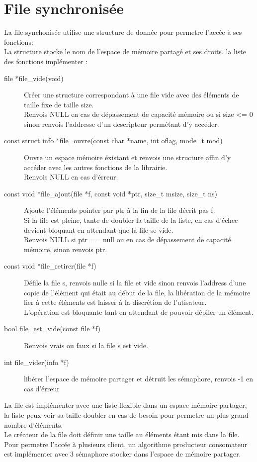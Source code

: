 \documentclass[12pt]{article}
\begin{document}
\section{File synchronisée}
    La file synchonisée utilise une structure de donnée pour permetre l'accée à ses fonctions:\\
    La structure stocke le nom de l'espace de mémoire partagé et ses droits.
    la liste des fonctions implémenter :
    \begin{description}
        \item [file *file\_vide(void)] Créer une structure correspondant à une file vide avec des éléments de taille
        fixe de taille size.\\
        Renvois NULL en cas de dépassement de capacité mémoire ou si size <= 0\\
        sinon renvois l'addresse d'un descripteur permétant d'y accéder.

        \item [const struct info *file\_ouvre(const char *name, int oflag, mode\_t mod)] Ouvre un espace mémoire éxistant et renvois une structure affin d'y accéder avec les autres fonctions de la librairie.\\
        Renvois NULL en cas d'érreur.

        \item [const void *file\_ajout(file *f, const void *ptr, size\_t msize, size\_t ns)]  Ajoute l'éléments pointer par ptr à la fin de la file décrit pas f.\\
        Si la file est pleine, tante de doubler la taille de la liste, en cas d'échec
        devient bloquant en attendant que la file se vide.\\
        Renvois NULL si ptr == null ou en cas de dépassement de capacité mémoire, sinon renvois ptr.

        \item [const void *file\_retirer(file *f)] Défile la file s, renvois nulle si la file et vide sinon renvois l'address d'une copie de l'élément qui était au début de la file, la libération de la mémoire lier à cette éléments est laisser à la discrétion de l'utisateur.\\
        L'opération est bloquante tant en attendant de pouvoir dépiler un élément.

        \item [bool file\_est\_vide(const file *f)] Renvois vrais ou faux si la file s est vide.

        \item [int file\_vider(info *f)] libérer l'espace de mémoire partager et détruit les sémaphore, renvois -1 en cas d'érreur
    \end{description}
    La file est implémenter avec une liste flexible dans un espace mémoire partager, la liste peux voir sa taille doubler en cas de besoin pour permetre un plus grand nombre d'éléments. \\
    Le créateur de la file doit définir une taille au éléments étant mis dans la file.\\
    Pour permetre l'accée à plusieurs client, un algorithme producteur consomateur est implémenter avec 3 sémaphore stocker dans l'espace de mémoire partager.
\end{document}
